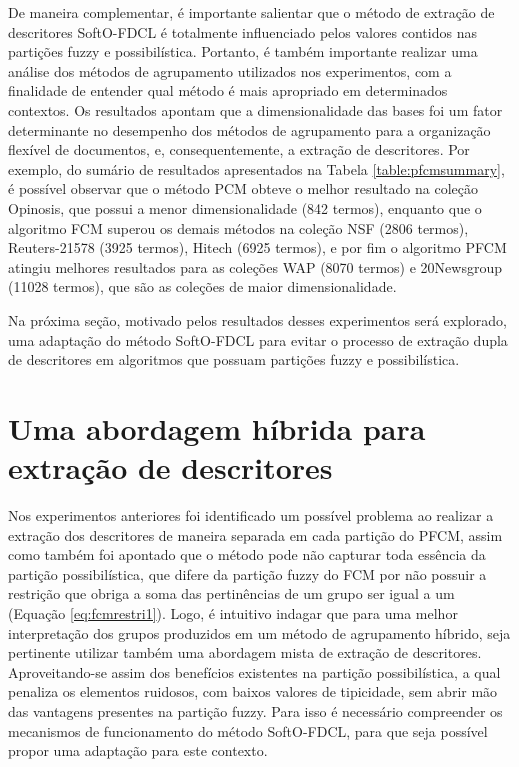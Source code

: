 De maneira complementar, é importante salientar que o método de extração de descritores SoftO-FDCL é
totalmente influenciado pelos valores contidos nas partições fuzzy e possibilística. Portanto, é
também importante realizar uma análise dos métodos de agrupamento utilizados nos experimentos, com
a finalidade de entender qual método é mais apropriado em determinados contextos. Os resultados apontam que a dimensionalidade das bases foi um fator determinante no desempenho dos
métodos de agrupamento para a organização flexível de documentos, e, consequentemente, a
extração de descritores. Por exemplo, do sumário de resultados apresentados na Tabela
\ref{table:pfcmsummary}, é possível observar que o método PCM obteve o melhor resultado na coleção
Opinosis, que possui a menor dimensionalidade (842 termos), enquanto que o algoritmo FCM superou os
demais métodos na coleção NSF (2806 termos), Reuters-21578 (3925 termos), Hitech (6925 termos), e por
fim o algoritmo PFCM atingiu melhores resultados para as coleções WAP (8070 termos) e 20Newsgroup
(11028 termos), que são as coleções de maior dimensionalidade.

Na próxima seção, motivado pelos resultados desses experimentos será explorado, uma adaptação do
método SoftO-FDCL para evitar o processo de extração dupla de descritores em algoritmos que possuam
partições fuzzy e possibilística.

\section{Uma abordagem híbrida para extração de descritores}

Nos experimentos anteriores foi identificado um possível problema ao realizar a extração dos
descritores de maneira separada em cada partição do PFCM, assim como também foi apontado que o
método pode não capturar toda essência da partição possibilística, que difere da partição fuzzy do
FCM por não possuir a restrição que obriga a soma das pertinências de um grupo ser igual a um
(Equação \ref{eq:fcmrestri1}).
Logo, é intuitivo indagar que para uma melhor interpretação dos grupos produzidos em um método de
agrupamento híbrido, seja pertinente utilizar também uma abordagem mista de extração de descritores.
Aproveitando-se assim dos benefícios existentes na partição possibilística, a qual penaliza os
elementos ruidosos, com baixos valores de tipicidade, sem abrir mão das vantagens presentes na
partição fuzzy. Para isso é necessário compreender os mecanismos de funcionamento do método
SoftO-FDCL, para que seja possível propor uma adaptação para este contexto.

